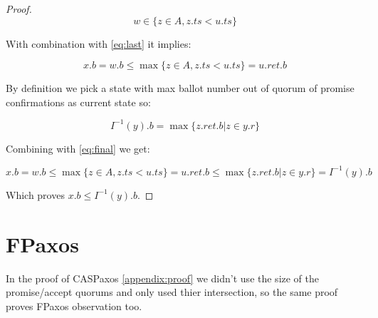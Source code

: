 \documentclass[12pt]{article}
\theoremstyle{definition}
\begin{document}
\begin{appendices}
\begin{proof}
  \begin{equation}
    w \in \{ z \in A, z.ts < u.ts \}
  \end{equation}

  With combination with \ref{eq:last} it implies:

  \begin{equation} \label{eq:final}
    x.b = w.b \leq \max \{ z \in A, z.ts < u.ts \} = u.ret.b
  \end{equation}

  By definition we pick a state with max ballot number out of quorum of promise confirmations as current state so:

  \begin{equation}
    I^{-1}(y).b = \max \{ z.ret.b | z \in y.r \}
  \end{equation}

  Combining with \ref{eq:final} we get:

  \begin{equation}
    x.b = w.b \leq \max \{ z \in A, z.ts < u.ts \} = u.ret.b \leq \max \{ z.ret.b | z \in y.r \} = I^{-1}(y).b
  \end{equation}

  Which proves $x.b \leq I^{-1}(y).b$.

\end{proof}

\section{FPaxos}
\label{appendix:fpaxos}
In the proof of CASPaxos \ref{appendix:proof} we didn't use the size of the promise/accept quorums and only used thier intersection, so the same proof proves FPaxos observation too.

\end{appendices}

\newpage
\end{document}
